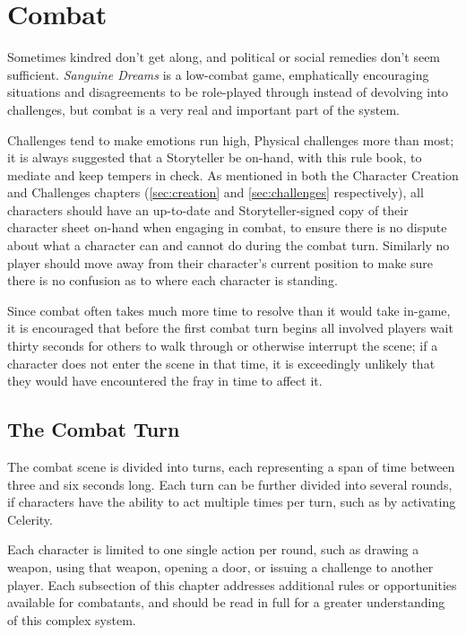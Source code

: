 \section{Combat}
\label{sec:combat}
Sometimes kindred don't get along, and political or social remedies don't seem sufficient.  
\emph{Sanguine Dreams} is a low-combat game, emphatically encouraging situations and 
disagreements to be role-played through instead of devolving into challenges, but combat is 
a very real and important part of the system.

Challenges tend to make emotions run high, Physical challenges more than most; it is always 
suggested that a Storyteller be on-hand, with this rule book, to mediate and keep tempers in 
check.  As mentioned in both the Character Creation and Challenges chapters (\ref{sec:creation} 
and \ref{sec:challenges} respectively), all characters should have an up-to-date and 
Storyteller-signed copy of their character sheet on-hand when engaging in combat, to ensure 
there is no dispute about what a character can and cannot do during the combat turn.  Similarly 
no player should move away from their character's current position to make sure there is no confusion 
as to where each character is standing.

Since combat often takes much more time to resolve than it would take in-game, it is encouraged that 
before the first combat turn begins all involved players wait thirty seconds for others to walk through 
or otherwise interrupt the scene; if a character does not enter the scene in that time, it is exceedingly 
unlikely that they would have encountered the fray in time to affect it.

\subsection{The Combat Turn}
The combat scene is divided into turns, each representing a span of time between three and six seconds 
long.  Each turn can be further divided into several rounds, if characters have the ability to act multiple 
times per turn, such as by activating Celerity.  

Each character is limited to one single action per round, such as drawing a weapon, using that weapon, 
opening a door, or issuing a challenge to another player.  Each subsection of this chapter addresses 
additional rules or opportunities available for combatants, and should be read in full for a greater 
understanding of this complex system.


